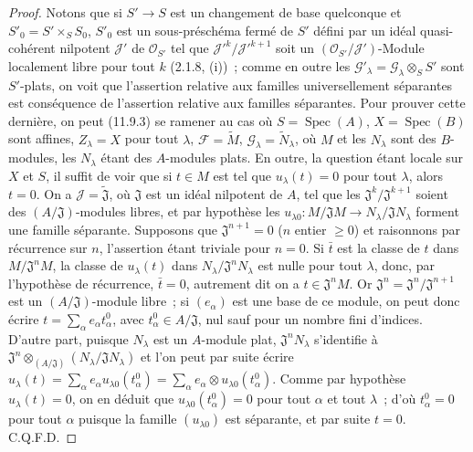 \begin{proof}
Notons que si $S'\to S$ est un changement de base quelconque et
$S'_0=S'\times_S S_0$, $S'_0$ est un sous-préschéma fermé de $S'$ défini par
un idéal quasi-cohérent nilpotent $\mathcal J'$ de $\mathcal O_{S'}$ tel que
$\mathcal J'^k/\mathcal J'^{k+1}$ soit un
$(\mathcal O_{S'}/\mathcal J')$-Module localement libre pour tout $k$
(2.1.8, (i))~; comme en outre les
$\mathcal G'_\lambda=\mathcal G_\lambda\otimes_S S'$ sont $S'$-plats, on voit
que l'assertion relative aux familles universellement séparantes est
conséquence de l'assertion relative aux familles séparantes. Pour prouver
cette dernière, on peut (11.9.3) se ramener au cas où
$S=\operatorname{Spec}(A)$, $X=\operatorname{Spec}(B)$ sont affines,
$Z_\lambda=X$ pour tout $\lambda$, $\mathcal F=\widetilde M$,
$\mathcal G_\lambda=\widetilde N_\lambda$, où $M$ et les $N_\lambda$ sont des
$B$-modules, les $N_\lambda$ étant des $A$-modules plats. En outre, la question
étant locale sur $X$ et $S$, il suffit de voir que si $t\in M$ est tel que
$u_\lambda(t)=0$ pour tout $\lambda$, alors $t=0$. On a
$\mathcal J=\widetilde{\mathfrak J}$, où $\mathfrak J$ est un idéal nilpotent
de $A$, tel que les $\mathfrak J^k/\mathfrak J^{k+1}$ soient des
$(A/\mathfrak J)$-modules libres, et par hypothèse les
$u_{\lambda0}:M/\mathfrak JM\to N_\lambda/\mathfrak JN_\lambda$ forment une
famille séparante. Supposons que $\mathfrak J^{n+1}=0$ ($n$ entier $\geq0$) et
raisonnons par récurrence sur $n$, l'assertion étant triviale pour $n=0$. Si
$\bar t$ est la classe de $t$ dans $M/\mathfrak J^nM$, la classe de
$u_\lambda(t)$ dans $N_\lambda/\mathfrak J^nN_\lambda$ est nulle pour tout
$\lambda$, donc, par l'hypothèse de récurrence, $\bar t=0$, autrement dit on a
$t\in\mathfrak J^nM$. Or
$\mathfrak J^n=\mathfrak J^n/\mathfrak J^{n+1}$ est un
$(A/\mathfrak J)$-module libre~; si $(e_\alpha)$ est une base de ce module, on
peut donc écrire $t=\sum_\alpha e_\alpha t^0_\alpha$, avec
$t^0_\alpha\in A/\mathfrak J$, nul sauf pour un nombre fini d'indices.
D'autre part, puisque $N_\lambda$ est un $A$-module plat,
$\mathfrak J^nN_\lambda$ s'identifie à
$\mathfrak J^n\otimes_{(A/\mathfrak J)}(N_\lambda/\mathfrak JN_\lambda)$ et
l'on peut par suite écrire
$u_\lambda(t)=\sum_\alpha e_\alpha u_{\lambda0}(t^0_\alpha)
=\sum_\alpha e_\alpha\otimes u_{\lambda0}(t^0_\alpha)$.
Comme par hypothèse $u_\lambda(t)=0$, on en déduit que
$u_{\lambda0}(t^0_\alpha)=0$ pour tout $\alpha$ et tout $\lambda$~; d'où
$t^0_\alpha=0$ pour tout $\alpha$ puisque la famille $(u_{\lambda0})$ est
séparante, et par suite $t=0$. C.Q.F.D.
\end{proof}

